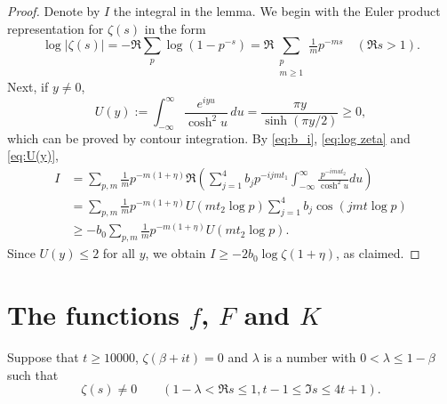 \documentclass[10pt]{amsart}
\theoremstyle{remark}
\theoremstyle{plain}
\numberwithin{equation}{section}
\theoremstyle{definition}
\def\({\left(}
\def\){\right)}
\def\lam{\lambda}
\begin{document}
\begin{proof}
Denote by $I$ the integral in the lemma.
We begin with the Euler product representation for $\zeta(s)$ in the form
\begin{equation}
\log | \zeta(s) | = -\Re \sum_p \log(1-p^{-s}) = \Re \sum_{\substack{p \\
 m\ge 1}}
 \tfrac1{m} p^{-ms} \quad (\Re s>1). \label{eq:log zeta}
\end{equation}
Next, if $y \ne 0$,
\begin{equation}
U(y) := \int_{-\infty}^\infty \frac{e^{iyu}}{\cosh^2 u} \, du = 
\frac{\pi y}{\sinh (\pi y/2)} \ge 0, \label{eq:U(y)}
\end{equation}
which can be proved by contour integration.
By \eqref{eq:b_i}, \eqref{eq:log zeta} and \eqref{eq:U(y)},
\begin{align*}
I &= \sum_{p,m} \tfrac1{m} p^{-m(1+\eta)} 
  \Re \( \sum_{j=1}^4 b_j p^{-ijmt_1}
  \int_{-\infty}^\infty \frac{p^{-i m u t_2}}{\cosh^2 u} du \) \\
&=  \sum_{p,m} \tfrac1{m}  p^{-m(1+\eta)} U(mt_2 \log p)
\sum_{j=1}^4 b_j \cos(jmt\log p) \\
&\ge -b_0 \sum_{p,m} \tfrac{1}{m} p^{-m(1+\eta)} U(m t_2 \log p).
\end{align*}
Since $U(y) \le 2$ for all $y$, we obtain $I\ge -2b_0\log \zeta(1+\eta)$,
as claimed.
\end{proof}


%
%
\section{The functions $f$, $F$ and $K$}\label{sec:fFK}
%
%
%

Suppose that $t\ge 10000$, $\zeta(\beta+it)=0$ and $\lam$ is
a number with $0<\lam \le 1-\beta$ such that
\begin{equation}
\zeta(s) \ne 0 \qquad
(1-\lam < \Re s \le 1, t-1 \le \Im s \le 4t+1).
\label{eq:lambda}
\end{equation}
\end{document}
